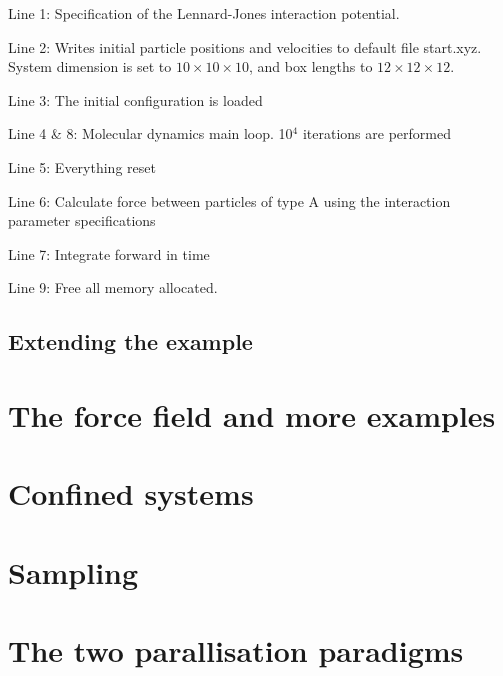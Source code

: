 \documentclass[11pt]{article}
\begin{document}
\noindent Line 1: Specification of the Lennard-Jones interaction potential.

\noindent Line 2: Writes initial particle positions and velocities to default file
\textsf{start.xyz}. System dimension is set to $10 \times 10 \times 10$, and box
lengths to $12 \times 12 \times 12$. 

\noindent Line 3: The initial configuration is loaded

\noindent Line 4 \& 8: Molecular dynamics main loop. 10$^4$ iterations are performed

\noindent Line 5: Everything reset

\noindent Line 6: Calculate force between particles of type A using the interaction
parameter specifications

\noindent Line 7: Integrate forward in time

\noindent Line 9: Free all memory allocated.

\subsection{Extending the example}

\section{The force field and more examples}
\section{Confined systems}
\section{Sampling}
\section{The two parallisation paradigms}
\end{document}
